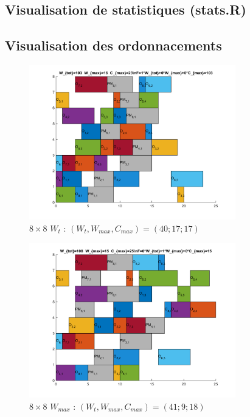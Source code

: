 \documentclass[10pt,a4paper]{scrartcl}
\begin{document}
%

\subsection{Visualisation de statistiques (stats.R)}
%

\subsection{Visualisation des ordonnacements}
\label{annexe:visual_ordo}
\begin{figure}
  \centering
  \includegraphics[width=0.8\textwidth]{img/results8x8_Wtot.png}
  \caption{$8 \times 8$ $W_{t}$ : $(W_t, W_{max}, C_{max}) = (40; 17; 17)$}
\end{figure}
\begin{figure}
  \centering
  \includegraphics[width=0.8\textwidth]{img/results8x8_Wmax.png}
  \caption{$8 \times 8$ $W_{max}$ : $(W_t, W_{max}, C_{max}) = (41; 9; 18)$}
\end{figure}
\end{document}
